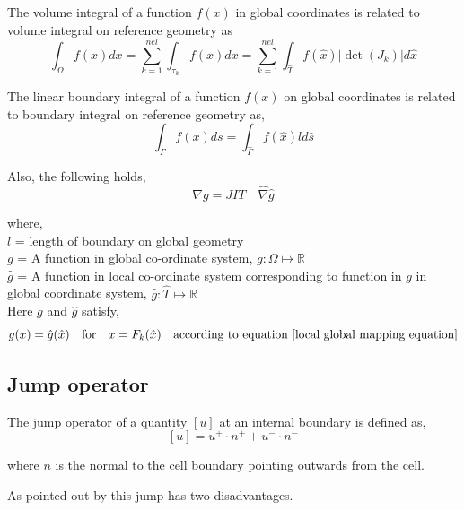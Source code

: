 \documentclass[a4paper,12pt]{book}
\begin{document}
The volume integral of a function $f(x)$ in global coordinates is related to volume integral on reference geometry as 
\begin{equation}\label{integral_local_global_volume}
\int_\Omega f(x) dx = \sum_{k=1}^{nel} \int_{\tau_k} f(x) dx = \sum_{k=1}^{nel} \int_{\hat{T}} f(\hat{x}) |\det(J_k)| d \hat{x}
\end{equation}

The linear boundary integral of a function $f(x)$ on global coordinates is related to boundary integral on reference geometry as, 
\begin{equation}\label{integral_local_global_boundary}
\int_{\Gamma} f(x) ds = \int_{\hat{\Gamma}} f(\hat{x}) l d \hat{s}
\end{equation}

Also, the following holds,
\begin{equation}\label{derivative_transformation}
\nabla g = JIT \quad \hat{\nabla} \hat{g} 
\end{equation}


where,
\\
$l$ = length of boundary on global geometry\\
$g$  = A function in global co-ordinate system, $g:\Omega \mapsto \mathbb{R}$\\
$\hat{g}$  = A function in local co-ordinate system corresponding to function in $g$ in global coordinate system, $\hat{g}:\hat{T} \mapsto \mathbb{R}$\\

Here $g$ and $\hat{g}$ satisfy,
\begin{equation}\label{func_transformation}
g(x) = \hat{g}(\hat{x}) \quad \textrm{for}  \quad x = F_k(\hat{x}) \quad \textrm{according to equation \eqref{local global mapping equation}}
\end{equation}

\subsection{Jump operator}

The jump operator of a quantity $[u]$ at an internal boundary is defined as,
\begin{equation}\label{jump operator}
[u]=u^+ \cdot n^+ + u^- \cdot n^-
\end{equation}

where $n$ is the normal to the cell boundary pointing outwards from the cell.

As pointed out by \cite{Montlaur2} this jump has two disadvantages.
\end{document}
